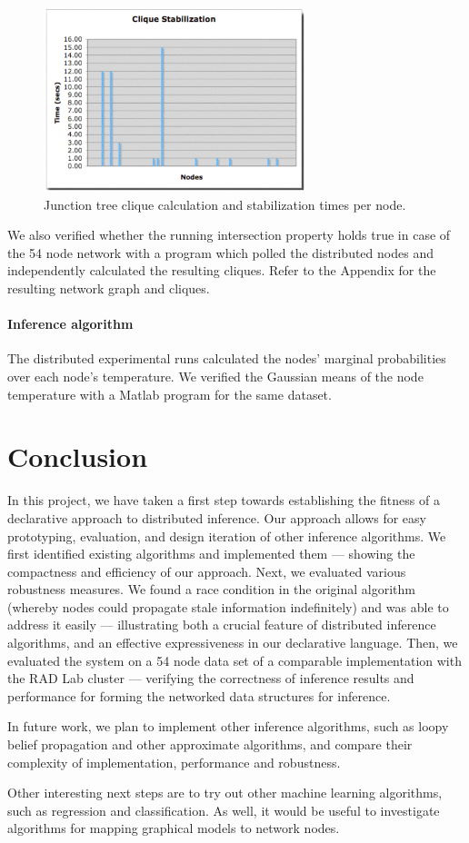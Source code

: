 \begin{figure}[htpb]
 \centering
 \includegraphics[width=3in]{figs/performance.eps}
 \caption{Junction tree clique calculation and stabilization times per node.}
 \label{fig:performance}
\end{figure}

We also verified whether the running intersection property holds true in case
of the 54 node network with a program which polled the distributed nodes and
independently calculated the resulting cliques. Refer to the Appendix for the
resulting network graph and cliques.

\paragraph{Inference algorithm} The distributed experimental runs calculated
the nodes' marginal probabilities over each node's temperature. We verified
the Gaussian means of the node temperature with a Matlab program for the same
dataset.

\section{Conclusion}
\label{sec:conc}

In this project, we have taken a first step towards establishing the fitness
of a declarative approach to distributed inference. Our approach allows for
easy prototyping, evaluation, and design iteration of other inference
algorithms. We first identified existing algorithms and implemented them ---
showing the compactness and efficiency of our approach. Next, we evaluated
various robustness measures. We found a race condition in the original
algorithm (whereby nodes could propagate stale information indefinitely) and
was able to address it easily --- illustrating both a crucial feature of
distributed inference algorithms, and an effective expressiveness in our
declarative language. Then, we evaluated the system on a 54 node data set of a
comparable implementation with the RAD Lab cluster --- verifying the
correctness of inference results and performance for forming the networked
data structures for inference.

In future work, we plan to implement other inference algorithms, such as loopy
belief propagation \cite{loopy} and other approximate algorithms, and compare their
complexity of implementation, performance and robustness. 

Other interesting next steps are to try out other machine learning algorithms,
such as regression and classification. As well, it would be useful to
investigate algorithms for mapping graphical models to network nodes.
